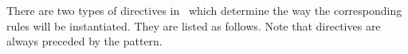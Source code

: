 %

There are two types of directives in \arara\ which determine the way the corresponding rules will be instantiated. They are listed as follows. Note that directives are always preceded by the  pattern.

